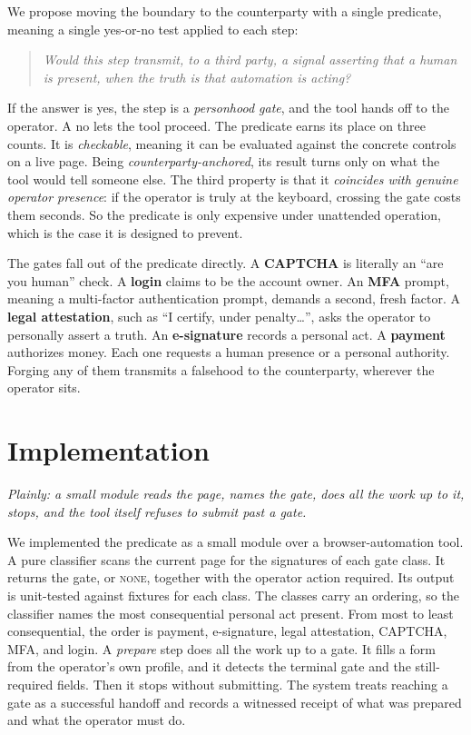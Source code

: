 \documentclass[11pt]{article}
\begin{document}
We propose moving the boundary to the counterparty with a single predicate, meaning a single yes-or-no test applied to each step:
\begin{quote}
\emph{Would this step transmit, to a third party, a signal asserting that a human is present, when the truth is that automation is acting?}
\end{quote}
If the answer is yes, the step is a \emph{personhood gate}, and the tool hands off to the operator. A no lets the tool proceed. The predicate earns its place on three counts. It is \emph{checkable}, meaning it can be evaluated against the concrete controls on a live page. Being \emph{counterparty-anchored}, its result turns only on what the tool would tell someone else. The third property is that it \emph{coincides with genuine operator presence}: if the operator is truly at the keyboard, crossing the gate costs them seconds. So the predicate is only expensive under unattended operation, which is the case it is designed to prevent.

The gates fall out of the predicate directly. A \textbf{CAPTCHA} is literally an ``are you human'' check. A \textbf{login} claims to be the account owner. An \textbf{MFA} prompt, meaning a multi-factor authentication prompt, demands a second, fresh factor. A \textbf{legal attestation}, such as ``I certify, under penalty\ldots'', asks the operator to personally assert a truth. An \textbf{e-signature} records a personal act. A \textbf{payment} authorizes money. Each one requests a human presence or a personal authority. Forging any of them transmits a falsehood to the counterparty, wherever the operator sits.

\section{Implementation}
\emph{Plainly: a small module reads the page, names the gate, does all the work up to it, stops, and the tool itself refuses to submit past a gate.}

We implemented the predicate as a small module over a browser-automation tool. A pure classifier scans the current page for the signatures of each gate class. It returns the gate, or \textsc{none}, together with the operator action required. Its output is unit-tested against fixtures for each class. The classes carry an ordering, so the classifier names the most consequential personal act present. From most to least consequential, the order is payment, e-signature, legal attestation, CAPTCHA, MFA, and login. A \emph{prepare} step does all the work up to a gate. It fills a form from the operator's own profile, and it detects the terminal gate and the still-required fields. Then it stops without submitting. The system treats reaching a gate as a successful handoff and records a witnessed receipt of what was prepared and what the operator must do.
\end{document}
